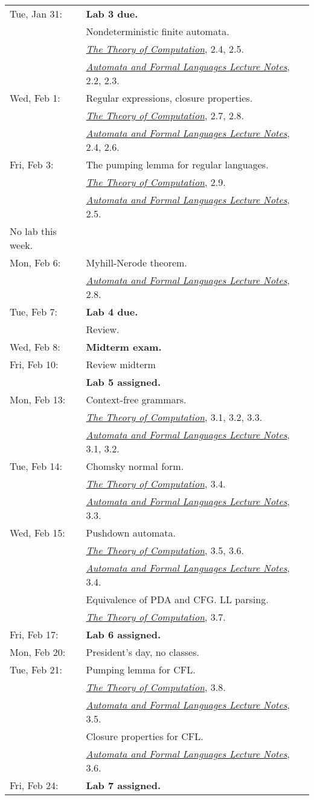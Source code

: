 \documentclass{article}
\newcommand{\theory}
           {\href{http://cg.scs.carleton.ca/~michiel/TheoryOfComputation/}
             {{\em The Theory of Computation}}}
\newcommand{\automata}
           {\href{http://users.utu.fi/jkari/automata/}
             {{\em Automata and Formal Languages Lecture Notes}}}
\begin{document}
\begin{longtable}{ll}
Tue, Jan 31:
& {\bf Lab 3 due.}
\\& Nondeterministic finite automata.
\\&\theory, 2.4, 2.5.
\\&\automata, 2.2, 2.3.
\\
Wed, Feb 1:
& Regular expressions, closure properties.
\\&\theory, 2.7,   2.8.
\\&\automata, 2.4, 2.6.
\\
Fri, Feb 3:
& The pumping lemma for regular languages.
\\&\theory, 2.9.
\\&\automata, 2.5.
\\\hline
No lab this week.
\\
Mon, Feb 6:
& Myhill-Nerode theorem.
\\&\automata, 2.8.
\\
Tue, Feb 7:
& {\bf Lab 4 due.}
\\& Review.
\\
Wed, Feb 8:
& {\bf Midterm exam.}
\\
Fri, Feb 10:
& Review midterm
\\& {\bf Lab 5 assigned.}
\\\hline
Mon, Feb 13:
& Context-free grammars.
\\&\theory, 3.1, 3.2, 3.3.
\\&\automata, 3.1,  3.2.
\\
Tue, Feb 14:
& Chomsky normal form.  \\&\theory, 3.4. \\&\automata, 3.3.
\\
Wed, Feb 15:
& Pushdown automata. \\&\theory, 3.5, 3.6.  \\&\automata, 3.4.
\\& Equivalence of PDA and CFG.  LL parsing. \\&\theory, 3.7.
\\
Fri, Feb 17:
& {\bf Lab 6 assigned.}
\\\hline
Mon, Feb 20:&  President's day, no classes.
\\
Tue, Feb 21:
& Pumping lemma for CFL.  \\&\theory, 3.8.  \\&\automata, 3.5.
\\& Closure properties for CFL. \\&\automata, 3.6.
\\
Fri, Feb 24:
& {\bf Lab 7 assigned.}
\\\hline

\end{longtable}
\end{document}
